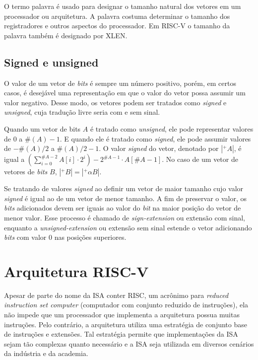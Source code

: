   O termo palavra é usado para designar o tamanho natural dos vetores em um processador ou arquitetura. 
  A palavra costuma determinar o tamanho dos registradores e outros aspectos do processador. 
  Em RISC-V o tamanho da palavra também é designado por XLEN.

\subsection{Signed e unsigned}
\label{sec:seu}

  O valor de um vetor de \emph{bits} é sempre um número positivo, porém, em certos casos, é desejável
  uma representação em que o valor do vetor possa assumir um valor negativo. Desse modo, os vetores
  podem ser tratados como \emph{signed} e \emph{unsigned}, cuja tradução livre seria com e sem sinal.

  Quando um vetor de bits $A$ é tratado como \emph{unsigned}, ele pode representar valores de $0$ a
  $\#(A) - 1$. E quando ele é tratado como \emph{signed}, ele pode assumir valores de $-\#(A)/2$ a 
  $\#(A)/2 - 1$. O valor \emph{signed} do vetor, denotado por $|^+A|$, é igual a $(\sum_{i =0}^{\#A-2}
  A[i]\cdot 2^i)-2^{\#A -1}\cdot A[\#A-1]$. No caso de um vetor de vetores de \emph{bits} $B$, 
  $|^+B| = |^+\alpha B|$.

  Se tratando de valores \emph{signed} ao definir um vetor de maior tamanho cujo valor 
  \emph{signed} é igual ao de um vetor de menor tamanho. A fim de
  preservar o valor, os \emph{bits} adicionados 
  devem ser iguais ao valor do \emph{bit} na maior posição do vetor de menor valor. Esse processo é 
  chamado de \emph{sign-extension} ou extensão com sinal, enquanto a \emph{unsigned-extension} ou extensão
  sem sinal estende o vetor adicionando \emph{bits} com valor $0$ nas posições superiores.

\newpage
\section{Arquitetura RISC-V}
\label{cap:isa}
  
  Apesar de parte do nome da ISA conter RISC, um acrônimo para \emph{reduced 
  instruction set computer} (computador com conjunto reduzido de instruções), 
  ela não impede que um processador que implementa a arquitetura possua muitas
  instruções. Pelo contrário, a arquitetura utiliza uma estratégia de conjunto base de 
  instruções e extensões. Tal estratégia permite que implementações da ISA sejam tão complexas
  quanto necessário e a ISA seja utilizada em diversos cenários da indústria e da academia.
  
